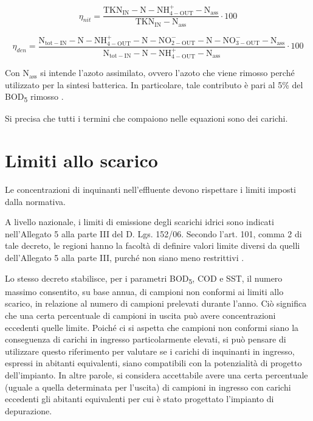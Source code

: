 \begin{equation}
\eta_{nit}=\frac{\operatorname{TKN_{IN}}-\operatorname{N-NH_{4-OUT}^{+}}-\operatorname{N_{ass}}}{\operatorname{TKN_{IN}}-\operatorname{N_{ass}}}\cdot 100
\end{equation}

\begin{equation}
\eta_{den}=\frac{\operatorname{N_{tot-IN}}-\operatorname{N-NH_{4-OUT}^{+}}-\operatorname{N-NO_{2-OUT}^{-}}-\operatorname{N-NO_{3-OUT}^{-}}-\operatorname{N_{ass}}}{\operatorname{N_{tot-IN}}-\operatorname{N-NH_{4-OUT}^{+}}-\operatorname{N_{ass}}}\cdot 100
\end{equation}

Con $\operatorname{N_{ass}}$ si intende l'azoto assimilato, ovvero l'azoto che viene rimosso perché utilizzato per la sintesi batterica. In particolare, tale contributo è pari al 5\% del BOD\textsubscript{5} rimosso \cite{collivignarelli2012ingegneria}.

Si precisa che tutti i termini che compaiono nelle equazioni sono dei carichi.

\section{Limiti allo scarico}
\label{sec:limiti_scarico}
Le concentrazioni di inquinanti nell'effluente devono rispettare i limiti imposti dalla normativa.

A livello nazionale, i limiti di emissione degli scarichi idrici sono indicati nell'Allegato 5 alla parte III del D. Lgs. 152/06.
Secondo l'art. 101, comma 2 di tale decreto, le regioni hanno la facoltà di definire valori limite diversi da quelli dell'Allegato 5 alla parte III, purché non siano meno restrittivi \cite{DLgs152}.

Lo stesso decreto stabilisce, per i parametri BOD\textsubscript{5}, COD e SST, il numero massimo consentito, su base annua, di campioni non conformi ai limiti allo scarico, in relazione al numero di campioni prelevati durante l'anno. Ciò significa che una certa percentuale di campioni in uscita può avere concentrazioni eccedenti quelle limite. 
Poiché ci si aspetta che campioni non conformi siano la conseguenza di carichi in ingresso particolarmente elevati, si può pensare di utilizzare questo riferimento per valutare se i carichi di inquinanti in ingresso, espressi in abitanti equivalenti, siano compatibili con la potenzialità di progetto dell'impianto. In altre parole, si considera accettabile avere una certa percentuale (uguale a quella determinata per l'uscita) di campioni in ingresso con carichi eccedenti gli abitanti equivalenti per cui è stato progettato l'impianto di depurazione.


